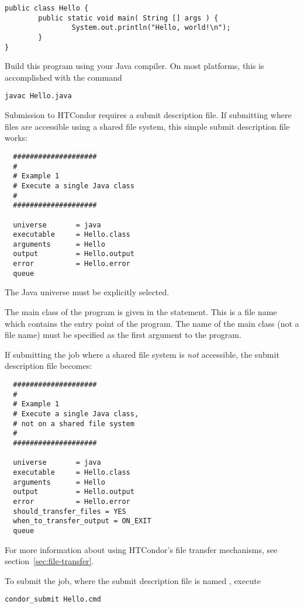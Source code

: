 \begin{verbatim}
public class Hello {
        public static void main( String [] args ) {
                System.out.println("Hello, world!\n");
        }
}
\end{verbatim}

Build this program using your Java compiler.
On most platforms, this is
accomplished with the command
\begin{verbatim}
javac Hello.java
\end{verbatim}

Submission to HTCondor requires a submit description file.
If submitting where files are accessible using a
shared file system,
this simple submit description file works:

\begin{verbatim}
  ####################
  #
  # Example 1
  # Execute a single Java class
  #
  ####################

  universe       = java
  executable     = Hello.class
  arguments      = Hello
  output         = Hello.output
  error          = Hello.error
  queue
\end{verbatim}

The Java universe must be explicitly selected.

The main class of the program is given in the  statement.
This is a file name which contains the entry point of the program.
The name of the main class (not a file name) must
be specified as the first argument to the program.

If submitting the job where a shared file system is \emph{not}
accessible,
the submit description file becomes:

\begin{verbatim}
  ####################
  #
  # Example 1
  # Execute a single Java class,
  # not on a shared file system
  #
  ####################

  universe       = java
  executable     = Hello.class
  arguments      = Hello
  output         = Hello.output
  error          = Hello.error
  should_transfer_files = YES
  when_to_transfer_output = ON_EXIT
  queue
\end{verbatim}
For more information about using HTCondor's file transfer mechanisms,
see section~\ref{sec:file-transfer}.

To submit the job, where the submit description file
is named , 
execute 
\begin{verbatim}
condor_submit Hello.cmd
\end{verbatim}

